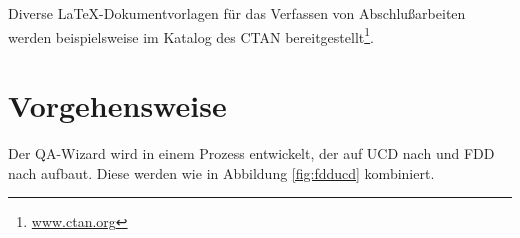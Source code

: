 \documentclass[12pt,        %
  english,ngerman,          %
  paper=a4,                 %
  captions=tablesignature,  %
  listof=numbered,          %
  bibliography=totoc,       %
  headings=small,           %
  headinclude=false,        %
  footinclude=false,        %
  parskip=half-,            %
  oneside,                  %
  BCOR=5mm,                 %
  DIV=12                    %
  ]{scrbook}                %
\begin{document}
Diverse \LaTeX-Dokumentvorlagen für das Verfassen von Abschlußarbeiten werden
beispielsweise im Katalog des CTAN
bereitgestellt\footnote{\href{https://www.ctan.org/}{www.ctan.org}}.

\section{Vorgehensweise}\label{sec:approach}


Der QA-Wizard wird in einem Prozess entwickelt, der auf UCD nach \cite{norman_draper-1986-ucd} und FDD nach \cite{Coad.ea-1999-java_modeling_uml} aufbaut. Diese werden wie in Abbildung \ref{fig:fdducd} kombiniert.
\end{document}

